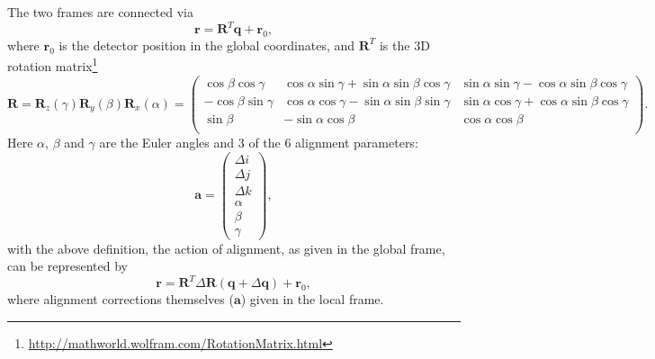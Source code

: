 \documentclass[a4paper,11pt]{article}
\begin{document}
The two frames are connected via
\begin{equation}
\textbf{r}=\textbf{R}^{T}\textbf{q} + \textbf{r}_{0},
\end{equation}
where $\textbf{r}_{0}$ is the detector position in the global coordinates, and $\textbf{R}^T$ is the 3D rotation matrix\footnote{\url{http://mathworld.wolfram.com/RotationMatrix.html}} 
\begin{equation}
\textbf{R}=\textbf{R}_z(\gamma)\textbf{R}_y(\beta)\textbf{R}_x(\alpha) =  
\begin{pmatrix} \cos\beta\cos\gamma & \cos\alpha\sin\gamma + \sin\alpha\sin\beta\cos\gamma & \sin\alpha\sin\gamma - \cos\alpha\sin\beta\cos\gamma \\
-\cos\beta\sin\gamma & \cos\alpha\cos\gamma - \sin\alpha\sin\beta\sin\gamma & \sin\alpha\cos\gamma + \cos\alpha\sin\beta\cos\gamma\\
\sin\beta & - \sin\alpha\cos\beta & \cos\alpha\cos\beta\\\end{pmatrix}.
\end{equation}
Here $\alpha$, $\beta$ and $\gamma$ are the Euler angles and 3 of the 6 alignment parameters:
\begin{equation}
\textbf{a} = \begin{pmatrix} \Delta i \\ \Delta j \\ \Delta k \\ \alpha \\ \beta \\ \gamma \end{pmatrix},
\end{equation}
with the above definition, the action of alignment, as given in the global frame, can be represented by
\begin{equation}
\textbf{r}=\textbf{R}^{T}\Delta\textbf{R}(\textbf{q}+\Delta\textbf{q}) + \textbf{r}_{0},
\end{equation}
where alignment corrections themselves ($\textbf{a}$) given in the local frame. 
\end{document}
